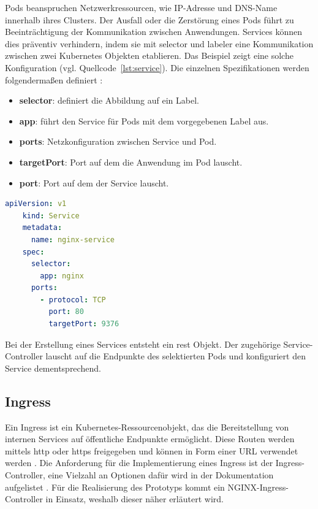 Pods beanspruchen Netzwerkressourcen, wie IP-Adresse und DNS-Name 
innerhalb ihres Clusters. Der Ausfall oder die Zerstörung eines Pods führt zu Beeinträchtigung der Kommunikation
zwischen Anwendungen. Services können dies präventiv verhindern, indem sie mit
selector und labeler eine Kommunikation zwischen zwei Kubernetes Objekten etablieren.
Das Beispiel zeigt eine solche Konfiguration (vgl. Quellcode~\ref{lst:service}). 
Die einzelnen Spezifikationen werden folgendermaßen definiert \cite{kubernetesservice}:

\begin{itemize}
  \item \textbf{selector}: definiert die Abbildung auf ein Label.
  \item \textbf{app}: führt den Service für Pods mit dem vorgegebenen Label aus.
  \item \textbf{ports}: Netzkonfiguration zwischen Service und Pod.
  \item \textbf{targetPort}: Port auf dem die Anwendung im Pod lauscht.
  \item \textbf{port}: Port auf dem der Service lauscht.
\end{itemize}

\begin{lstlisting}[caption={service.yaml \cite{kubernetesservice} },captionpos=b,label={lst:service},language=yaml]
    apiVersion: v1
    kind: Service
    metadata:
      name: nginx-service
    spec:
      selector:
        app: nginx
      ports:
        - protocol: TCP
          port: 80
          targetPort: 9376
    \end{lstlisting}


Bei der Erstellung eines Services entsteht ein \acs{rest} Objekt. 
Der zugehörige Service-Controller lauscht auf die Endpunkte des selektierten Pods und konfiguriert den Service dementsprechend. 


\subsection{Ingress} \label{nginx-ingress}

Ein Ingress ist ein Kubernetes-Ressourcenobjekt, das die Bereitstellung von internen Services auf öffentliche Endpunkte ermöglicht.
Diese Routen werden mittels \acs{http} oder \acs{https} freigegeben und können in Form einer URL verwendet werden \cite{kubernetesingress}.
Die Anforderung für die Implementierung eines Ingress ist der Ingress-Controller, eine Vielzahl an Optionen dafür wird in der 
Dokumentation aufgelistet \cite{kubernetesingresscontroller}. Für die Realisierung des Prototyps kommt ein NGINX-Ingress-Controller in Einsatz, weshalb
dieser näher erläutert wird.

